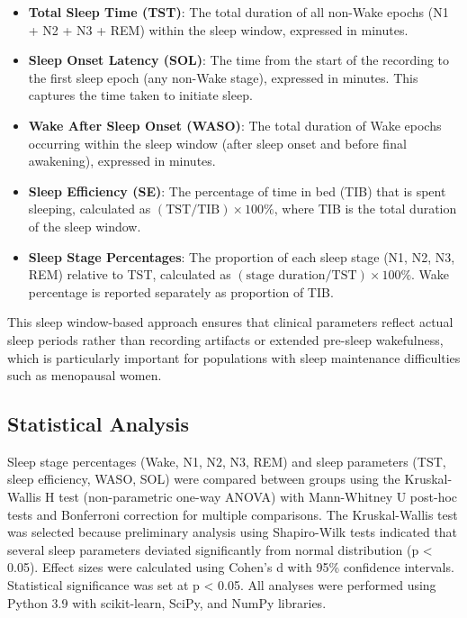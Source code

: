 \documentclass[a4paper,fleqn]{cas-dc}
\begin{document}
\begin{itemize}
\item \textbf{Total Sleep Time (TST)}: The total duration of all non-Wake epochs (N1 + N2 + N3 + REM) within the sleep window, expressed in minutes.
\item \textbf{Sleep Onset Latency (SOL)}: The time from the start of the recording to the first sleep epoch (any non-Wake stage), expressed in minutes. This captures the time taken to initiate sleep.
\item \textbf{Wake After Sleep Onset (WASO)}: The total duration of Wake epochs occurring within the sleep window (after sleep onset and before final awakening), expressed in minutes.
\item \textbf{Sleep Efficiency (SE)}: The percentage of time in bed (TIB) that is spent sleeping, calculated as $(\text{TST} / \text{TIB}) \times 100\%$, where TIB is the total duration of the sleep window.
\item \textbf{Sleep Stage Percentages}: The proportion of each sleep stage (N1, N2, N3, REM) relative to TST, calculated as $(\text{stage duration} / \text{TST}) \times 100\%$. Wake percentage is reported separately as proportion of TIB.
\end{itemize}

This sleep window-based approach ensures that clinical parameters reflect actual sleep periods rather than recording artifacts or extended pre-sleep wakefulness, which is particularly important for populations with sleep maintenance difficulties such as menopausal women.

\subsection{Statistical Analysis}

Sleep stage percentages (Wake, N1, N2, N3, REM) and sleep parameters (TST, sleep efficiency, WASO, SOL) were compared between groups using the Kruskal-Wallis H test (non-parametric one-way ANOVA) with Mann-Whitney U post-hoc tests and Bonferroni correction for multiple comparisons. The Kruskal-Wallis test was selected because preliminary analysis using Shapiro-Wilk tests indicated that several sleep parameters deviated significantly from normal distribution (p < 0.05). Effect sizes were calculated using Cohen's d with 95\% confidence intervals. Statistical significance was set at p < 0.05. All analyses were performed using Python 3.9 with scikit-learn, SciPy, and NumPy libraries.
\end{document}

